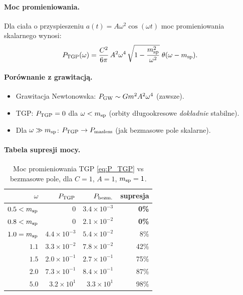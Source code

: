 \paragraph{Moc promieniowania.}
Dla ciała o przyspieszeniu $a(t) = A\omega^2\cos(\omega t)$ moc
promieniowania skalarnego wynosi:
\begin{equation}
P_{\rm TGP}(\omega)
= \frac{C^2}{6\pi}\,A^2\omega^4\,
\sqrt{1 - \frac{m_{\rm sp}^2}{\omega^2}}\;
\theta(\omega - m_{\rm sp}).
\label{eq:P_TGP}
\end{equation}

\paragraph{Porównanie z grawitacją.}
\begin{itemize}
\item Grawitacja Newtonowska: $P_{\rm GW} \sim G m^2 A^2 \omega^4$ (zawsze).
\item TGP: $P_{\rm TGP} = 0$ dla $\omega < m_{\rm sp}$
  (orbity długookresowe \emph{dokładnie} stabilne).
\item Dla $\omega \gg m_{\rm sp}$: $P_{\rm TGP} \to P_{\rm masless}$
  (jak bezmasowe pole skalarne).
\end{itemize}

\paragraph{Tabela supresji mocy.}

\begin{table}[h]
\centering
\caption{Moc promieniowania TGP \eqref{eq:P_TGP} vs bezmasowe pole,
         dla $C=1$, $A=1$, $m_{\rm sp}=1$.}
\begin{tabular}{rrrr}
\toprule
$\omega$ & $P_{\rm TGP}$ & $P_{\rm bezm.}$ & supresja \\
\midrule
$0.5 < m_{\rm sp}$ & 0 & $3.4\times10^{-3}$ & \textbf{0\%} \\
$0.8 < m_{\rm sp}$ & 0 & $2.1\times10^{-2}$ & \textbf{0\%} \\
$1.0 = m_{\rm sp}$ & $4.4\times10^{-3}$ & $5.4\times10^{-2}$ & 8\% \\
$1.1$ & $3.3\times10^{-2}$ & $7.8\times10^{-2}$ & 42\% \\
$1.5$ & $2.0\times10^{-1}$ & $2.7\times10^{-1}$ & 75\% \\
$2.0$ & $7.3\times10^{-1}$ & $8.4\times10^{-1}$ & 87\% \\
$5.0$ & $3.2\times10^{1}$ & $3.3\times10^{1}$ & 98\% \\
\bottomrule
\end{tabular}
\end{table}

